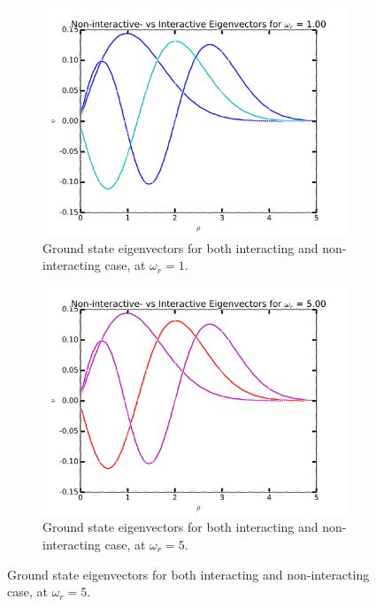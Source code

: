 \documentclass[11pt,a4paper,notitlepage]{article}
\begin{document}
\begin{figure}[H]
\begin{subfigure}[t]{0.45\textwidth}
    \end{subfigure}
    \begin{subfigure}[b]{0.45\textwidth}
        \includegraphics[scale=0.40]{../interacting_eigvecs_at_omega=1000.png}
        \caption{Ground state eigenvectors for both interacting and non-interacting case, at $\omega_r = 1$.}\label{fig:eigvecs-interact1000}
    \end{subfigure}
    \hfill
    \begin{subfigure}[b]{0.45\textwidth}
        \includegraphics[scale=0.40]{../interacting_eigvecs_at_omega=5000.png}
        \caption{Ground state eigenvectors for both interacting and non-interacting case, at $\omega_r = 5$.}\label{fig:eigvecs-interact5000}
    \end{subfigure}

\end{figure}
\end{document}
